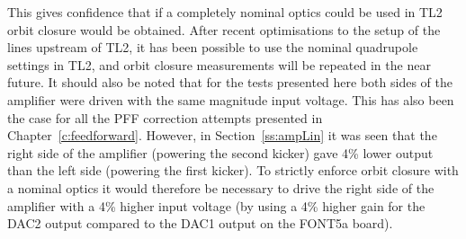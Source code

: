 This gives confidence that if a completely nominal optics could be 
used in TL2 orbit closure would be obtained. 
After recent optimisations to the setup of the lines upstream of TL2, it has been possible to use the nominal quadrupole settings in TL2, and orbit closure measurements will be repeated in the near future.
It should also be 
noted that for the tests presented here both sides of the amplifier were driven with the same magnitude input voltage. This has also been the case for 
all the PFF correction attempts presented in Chapter~\ref{c:feedforward}. 
However, in Section~\ref{ss:ampLin} it was seen that the right side of the amplifier (powering the second kicker) gave 4\% lower output than the left side (powering the first kicker).
To strictly enforce orbit closure with a nominal optics it would 
therefore be necessary to drive the right side of the amplifier with 
a 4\% higher input voltage (by using a 4\% higher gain for the DAC2 
output compared to the DAC1 output on the FONT5a board).




